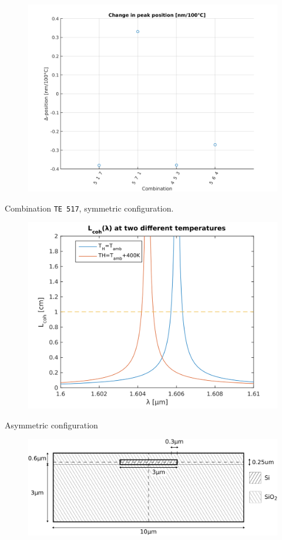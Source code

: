 \documentclass[11pt, leqno]{beamer}
\begin{document}
\begin{frame}
	\begin{figure}
		\centering
		\includegraphics[height=.9\textheight]{ppc2.png}
	\end{figure}
\end{frame}
\begin{frame}
	Combination \texttt{TE 517}, symmetric configuration.
	\begin{figure}
		\centering
		\includegraphics[width=.8\textwidth]{bandwidth_movement_TE517_sym.png}
	\end{figure}
\end{frame}
\begin{frame}{Asymmetric configuration}
	\begin{figure}
		\centering
		\includegraphics[width=\textwidth]{geometryA.pdf}
	\end{figure}
\end{frame}
\end{document}
